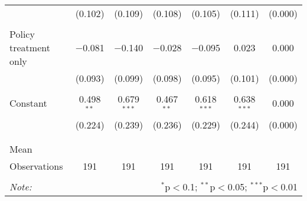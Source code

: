 \begin{tabular}{@{\extracolsep{5pt}}lcccccc}
  & (0.102) & (0.109) & (0.108) & (0.105) & (0.111) & (0.000) \\ 
  & & & & & & \\ 
 Policy treatment only & $-$0.081 & $-$0.140 & $-$0.028 & $-$0.095 & 0.023 & 0.000 \\ 
  & (0.093) & (0.099) & (0.098) & (0.095) & (0.101) & (0.000) \\ 
  & & & & & & \\ 
 Constant & 0.498$^{**}$ & 0.679$^{***}$ & 0.467$^{**}$ & 0.618$^{***}$ & 0.638$^{***}$ & 0.000 \\ 
  & (0.224) & (0.239) & (0.236) & (0.229) & (0.244) & (0.000) \\ 
  & & & & & & \\ 
\hline \\[-1.8ex] 
Mean &  &  &  &  &  &  \\ 
Observations & 191 & 191 & 191 & 191 & 191 & 191 \\ 
\hline 
\hline \\[-1.8ex] 
\textit{Note:}  & \multicolumn{6}{r}{$^{*}$p$<$0.1; $^{**}$p$<$0.05; $^{***}$p$<$0.01} \\ 
\end{tabular} 
